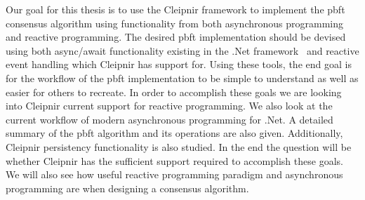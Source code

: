 Our goal for this thesis is to use the Cleipnir framework to implement the \ac{pbft} consensus algorithm using functionality from both asynchronous programming and reactive programming. The desired \ac{pbft} implementation should be devised using both async/await functionality existing in the .Net framework~\cite{DOC:AsyncAwait} and reactive event handling which Cleipnir has support for. Using these tools, the end goal is for the workflow of the \ac{pbft} implementation to be simple to understand as well as easier for others to recreate. In order to accomplish these goals we are looking into Cleipnir current support for reactive programming. We also look at the current workflow of modern asynchronous programming for .Net. A detailed summary of the \ac{pbft} algorithm and its operations are also given. Additionally, Cleipnir persistency functionality is also studied.
In the end the question will be whether Cleipnir has the sufficient support required to accomplish these goals. We will also see how useful reactive programming paradigm and asynchronous programming are when designing a consensus algorithm.


